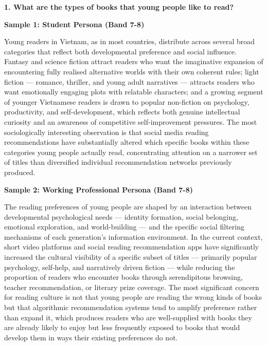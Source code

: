 \partthreeheader

\begin{ieltsquestion}
\textbf{1. What are the types of books that young people like to read?}
\end{ieltsquestion}
\textbf{Sample 1: Student Persona (Band 7-8)}

Young readers in Vietnam, as in most countries, distribute across several broad categories that reflect both developmental preference and social influence. Fantasy and science fiction attract readers who want the imaginative expansion of encountering fully realised alternative worlds with their own coherent rules; light fiction — romance, thriller, and young adult narratives — attracts readers who want emotionally engaging plots with relatable characters; and a growing segment of younger Vietnamese readers is drawn to popular non-fiction on psychology, productivity, and self-development, which reflects both genuine intellectual curiosity and an awareness of competitive self-improvement pressures. The most sociologically interesting observation is that social media reading recommendations have substantially altered which specific books within these categories young people actually read, concentrating attention on a narrower set of titles than diversified individual recommendation networks previously produced.

\textbf{Sample 2: Working Professional Persona (Band 7-8)}

The reading preferences of young people are shaped by an interaction between developmental psychological needs — identity formation, social belonging, emotional exploration, and world-building — and the specific social filtering mechanisms of each generation's information environment. In the current context, short video platforms and social reading recommendation apps have significantly increased the cultural visibility of a specific subset of titles — primarily popular psychology, self-help, and narratively driven fiction — while reducing the proportion of readers who encounter books through serendipitous browsing, teacher recommendation, or literary prize coverage. The most significant concern for reading culture is not that young people are reading the wrong kinds of books but that algorithmic recommendation systems tend to amplify preference rather than expand it, which produces readers who are well-supplied with books they are already likely to enjoy but less frequently exposed to books that would develop them in ways their existing preferences do not.

